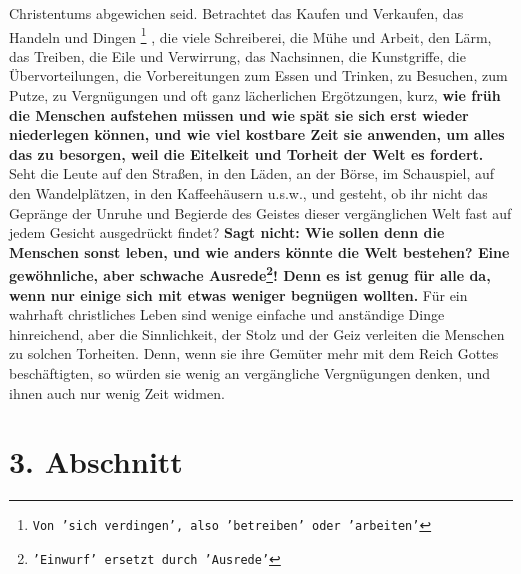 Christentums abgewichen seid. Betrachtet das Kaufen und Verkaufen, das Handeln
und Dingen \footnote{\texttt{Von 'sich verdingen', also 'betreiben' oder 'arbeiten'}}
, die viele Schreiberei, die Mühe und Arbeit, den Lärm, das Treiben,
die Eile und Verwirrung, das Nachsinnen, die Kunstgriffe, die
Übervorteilungen, die Vorbereitungen zum Essen und Trinken, zu Besuchen, zum
Putze, zu Vergnügungen und oft ganz lächerlichen Ergötzungen, kurz, \textbf{wie früh die
Menschen aufstehen müssen und wie spät sie sich erst wieder niederlegen können,
und wie viel kostbare Zeit sie anwenden, um alles das zu besorgen, weil die
Eitelkeit und Torheit der Welt es fordert.} Seht die Leute auf den Straßen, in den
Läden, an der Börse, im Schauspiel, auf den Wandelplätzen, in den
Kaffeehäusern u.s.w., und gesteht, ob ihr nicht das Gepränge der Unruhe und
Begierde des Geistes dieser vergänglichen Welt fast auf jedem Gesicht
ausgedrückt findet?
\label{ref:15_02_genug_fuer_alle}
\textbf{Sagt nicht: Wie sollen denn die Menschen sonst leben, und
wie anders könnte die Welt bestehen? Eine gewöhnliche, aber schwache Ausrede\footnote{\texttt{'Einwurf' ersetzt durch 'Ausrede'}}!
Denn es ist genug für alle da, wenn nur einige sich mit 
etwas weniger begnügen
wollten.} Für ein wahrhaft christliches Leben sind wenige 
einfache und anständige
Dinge hinreichend, aber die Sinnlichkeit, der Stolz und der Geiz verleiten die
Menschen zu solchen Torheiten. Denn, wenn sie ihre Gemüter mehr mit dem Reich
Gottes beschäftigten, so würden sie wenig an vergängliche Vergnügungen denken,
und ihnen auch nur wenig Zeit widmen.

\section{3. Abschnitt} \label{kap15_ab3}

